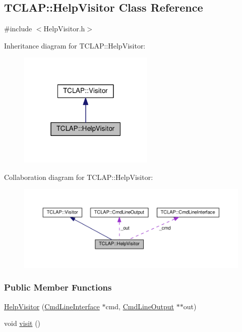 \hypertarget{classTCLAP_1_1HelpVisitor}{}\subsection{T\+C\+L\+AP\+:\+:Help\+Visitor Class Reference}
\label{classTCLAP_1_1HelpVisitor}


{\ttfamily \#include $<$Help\+Visitor.\+h$>$}



Inheritance diagram for T\+C\+L\+AP\+:\+:Help\+Visitor\+:
\nopagebreak
\begin{figure}[H]
\begin{center}
\leavevmode
\includegraphics[width=183pt]{classTCLAP_1_1HelpVisitor__inherit__graph}
\end{center}
\end{figure}


Collaboration diagram for T\+C\+L\+AP\+:\+:Help\+Visitor\+:
\nopagebreak
\begin{figure}[H]
\begin{center}
\leavevmode
\includegraphics[width=350pt]{classTCLAP_1_1HelpVisitor__coll__graph}
\end{center}
\end{figure}
\subsubsection*{Public Member Functions}
\begin{DoxyCompactItemize}
\item 
\hyperlink{classTCLAP_1_1HelpVisitor_a425e96efa6950b1949f1f81d4ff133f1}{Help\+Visitor} (\hyperlink{classTCLAP_1_1CmdLineInterface}{Cmd\+Line\+Interface} $\ast$cmd, \hyperlink{classTCLAP_1_1CmdLineOutput}{Cmd\+Line\+Output} $\ast$$\ast$out)
\item 
void \hyperlink{classTCLAP_1_1HelpVisitor_a157294efe254edb2b713b7c458aad3f2}{visit} ()
\end{DoxyCompactItemize}
